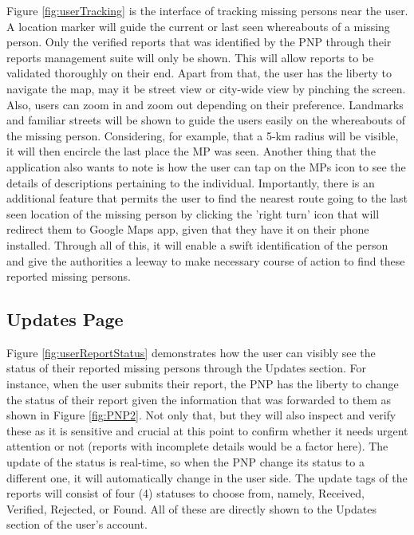 Figure \ref{fig:userTracking} is the interface of tracking missing persons near the user. A location marker will guide the current or last seen whereabouts of a missing person. Only the verified reports that was identified by the PNP through their reports management suite will only be shown. This will allow reports to be validated thoroughly on their end. Apart from that, the user has the liberty to navigate the map, may it be street view or city-wide view by pinching the screen. Also, users can zoom in and zoom out depending on their preference. Landmarks and familiar streets will be shown to guide the users easily on the whereabouts of the missing person. Considering, for example, that a 5-km radius will be visible, it will then encircle the last place the MP was seen. Another thing that the application also wants to note is how the user can tap on the MPs icon to see the details of descriptions pertaining to the individual. Importantly, there is an additional feature that permits the user to find the nearest route going to the last seen location of the missing person by clicking the 'right turn' icon that will redirect them to Google Maps app, given that they have it on their phone installed. Through all of this, it will enable a swift identification of the person and give the authorities a leeway to make necessary course of action to find these reported missing persons.

\subsection{Updates Page}

Figure \ref{fig:userReportStatus} demonstrates how the user can visibly see the status of their reported missing persons through the Updates section. For instance, when the user submits their report, the PNP has the liberty to change the status of their report given the information that was forwarded to them as shown in Figure \ref{fig:PNP2}. Not only that, but they will also inspect and verify these as it is sensitive and crucial at this point to confirm whether it needs urgent attention or not (reports with incomplete details would be a factor here). The update of the status is real-time, so when the PNP change its status to a different one, it will automatically change in the user side. The update tags of the reports will consist of four (4) statuses to choose from, namely, Received, Verified, Rejected, or Found. All of these are directly shown to the Updates section of the user's account.

